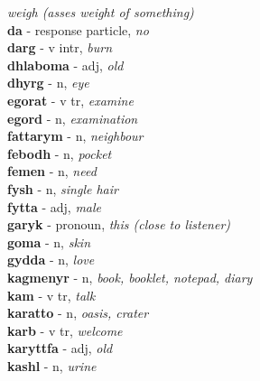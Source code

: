 \emph{weigh (asses weight of something)}\\ \vspace{7pt}\textbf{da}   - response particle, \emph{no}\\ \vspace{7pt}\textbf{darg}   - v intr, \emph{burn}\\ \vspace{7pt}\textbf{dhlaboma}   - adj, \emph{old}\\ \vspace{7pt}\textbf{dhyrg}   - n, \emph{eye}\\ \vspace{7pt}\textbf{egorat}   - v tr, \emph{examine}\\ \vspace{7pt}\textbf{egord}   - n, \emph{examination}\\ \vspace{7pt}\textbf{fattarym}   - n, \emph{neighbour}\\ \vspace{7pt}\textbf{febodh}   - n, \emph{pocket}\\ \vspace{7pt}\textbf{femen}   - n, \emph{need}\\ \vspace{7pt}\textbf{fysh}   - n, \emph{single hair}\\ \vspace{7pt}\textbf{fytta}   - adj, \emph{male}\\ \vspace{7pt}\textbf{garyk}   - pronoun, \emph{this (close to listener)}\\ \vspace{7pt}\textbf{goma}   - n, \emph{skin}\\ \vspace{7pt}\textbf{gydda}   - n, \emph{love}\\ \vspace{7pt}\textbf{kagmenyr}   - n, \emph{book, booklet, notepad, diary}\\ \vspace{7pt}\textbf{kam}   - v tr, \emph{talk}\\ \vspace{7pt}\textbf{karatto}   - n, \emph{oasis, crater}\\ \vspace{7pt}\textbf{karb}   - v tr, \emph{welcome}\\ \vspace{7pt}\textbf{karyttfa}   - adj, \emph{old}\\ \vspace{7pt}\textbf{kashl}   - n, \emph{urine}\\ 